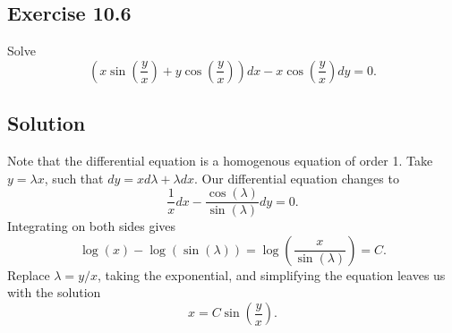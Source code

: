\subsection*{Exercise 10.6}

Solve
\begin{equation*}
    \left(x \sin\left(\frac{y}{x}\right) + y \cos\left(\frac{y}{x}\right)\right)dx - x \cos\left(\frac{y}{x}\right) dy = 0.
\end{equation*}

\subsection*{Solution}

Note that the differential equation is a homogenous equation of order 1.
Take $y = \lambda x$, such that $dy = xd\lambda + \lambda dx$.
Our differential equation changes to
\begin{equation*}
    \frac{1}{x} dx - \frac{\cos(\lambda)}{\sin(\lambda)} dy = 0.
\end{equation*}
Integrating on both sides gives
\begin{equation*}
    \log(x) - \log(\sin(\lambda)) = \log\left(\frac{x}{\sin(\lambda)}\right) = C.
\end{equation*}
Replace $\lambda = y/x$, taking the exponential, and simplifying the equation leaves us with the solution
\begin{equation*}
    x = C \sin\left(\frac{y}{x}\right).
\end{equation*}
